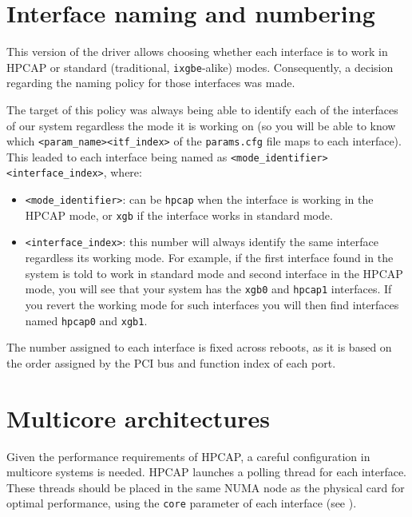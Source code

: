 \documentclass[a4paper,oneside]{hpman}
\begin{document}
\section{Interface naming and numbering}
\label{sec:InterfaceNaming}

This version of the driver allows choosing whether each interface is to work in HPCAP or standard (traditional, \texttt{ixgbe}-alike) modes. Consequently, a decision regarding the naming policy for those interfaces was made.

The target of this policy was always being able to identify each of the interfaces of our system regardless the mode it is working on (so you will be able to know which \texttt{<param\_name><itf\_index>} of the \texttt{params.cfg} file maps to each interface). This leaded to each interface being named as \texttt{<mode\_identifier><interface\_index>}, where:
\begin{itemize}
    \item \texttt{<mode\_identifier>}: can be \texttt{hpcap} when the interface is working in the HPCAP mode, or \texttt{xgb} if the interface works in standard mode.

    \item \texttt{<interface\_index>}: this number will always identify the same interface regardless its working mode. For example, if the first interface found in the system is told to work in standard mode and second interface in the HPCAP mode, you will see that your system has the \texttt{xgb0} and \texttt{hpcap1} interfaces. If you revert the working mode for such interfaces you will then find interfaces named \texttt{hpcap0} and \texttt{xgb1}.
\end{itemize}

The number assigned to each interface is fixed across reboots, as it is based on the order assigned by the PCI bus and function index of each port.

\section{Multicore architectures}
\label{sec:NUMAArch}

Given the performance requirements of HPCAP, a careful configuration in multicore systems is needed. HPCAP launches a polling thread for each interface. These threads should be placed in the same NUMA node as the physical card for optimal performance, using the \texttt{core} parameter of each interface (see ).
\end{document}
